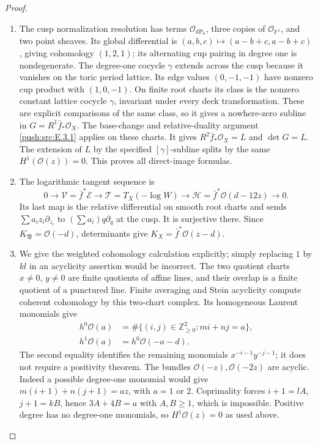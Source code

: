 \begin{proof}
\begin{enumerate}[label=\arabic*.,leftmargin=*]
\item The cusp normalization resolution has terms
$\mathcal O_{\mathrm{dP}_6}$, three copies of
$\mathcal O_{\mathbb P^1}$, and two point sheaves.
Its global differential is $(a,b,c)\mapsto
(a-b+c,a-b+c)$, giving cohomology $(1,2,1)$; its alternating cup
pairing in degree one is nondegenerate.  The degree-one cocycle
$\gamma$ extends across the cusp because it vanishes on the toric
period lattice.  Its edge values $(0,-1,-1)$ have nonzero cup
product with $(1,0,-1)$.  On finite root charts its class is the
nonzero constant lattice cocycle $\gamma$, invariant under every
deck transformation.  These are explicit comparisons of the
same class, so it gives a nowhere-zero subline in
$G=R^1\bar f_*\mathcal O_X$.
The base-change and relative-duality argument \ref{push:src:E.3.1} applies on
these charts.  It gives $R^2\bar f_*\mathcal O_X=L$ and
$\det G=L$.  The extension of $L$ by the specified
$[\gamma]$-subline splits by the same $H^1(\mathcal O(z))=0$.
This proves all direct-image formulas.

\item The logarithmic tangent sequence is
\[
 0\longrightarrow\mathcal V=\bar f^*\mathcal E
 \longrightarrow\mathcal T=T_X(-\log W)
 \longrightarrow\mathcal H=\bar f^*\mathcal O(d-12z)
 \longrightarrow0.
\]
Its last map is the relative differential on smooth root charts
and sends $\sum a_i z_i\partial_{z_i}$ to
$(\sum a_i)q\partial_q$ at the cusp.  It is surjective there.
Since $K_{\mathfrak B}=\mathcal O(-d)$, determinants give
$K_X=\bar f^*\mathcal O(z-d)$.

\item We give the weighted cohomology calculation explicitly; simply
replacing $1$ by $kl$ in an acyclicity assertion would be incorrect.
The two quotient charts $x\ne0$, $y\ne0$ are finite quotients
of affine lines, and their overlap is a finite quotient of a
punctured line.  Finite averaging and Stein acyclicity compute
coherent cohomology by this two-chart complex.  Its homogeneous
Laurent monomials give
\[
 \begin{split}
 h^0\mathcal O(a)&=\#\{(i,j)\in\mathbb Z_{\ge0}^2:mi+nj=a\},\\
 h^1\mathcal O(a)&=h^0\mathcal O(-a-d).
 \end{split}
\]
The second equality identifies the remaining monomials
$x^{-i-1}y^{-j-1}$; it does not require a positivity theorem.
The bundles $\mathcal O(-z),\mathcal O(-2z)$ are acyclic.
Indeed a possible degree-one monomial would give
$m(i+1)+n(j+1)=az$, with $a=1$ or $2$.
Coprimality forces $i+1=lA$, $j+1=kB$, hence
$3A+4B=a$ with $A,B\ge1$, which is impossible.
Positive degree has no degree-one monomials, so
$H^1\mathcal O(z)=0$ as used above.


\end{enumerate}
\end{proof}
